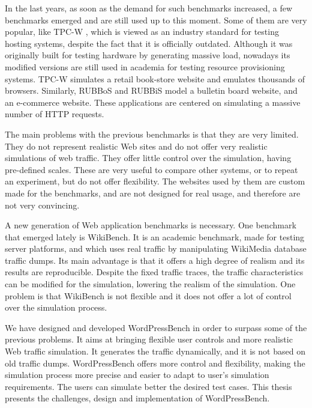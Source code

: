 In the last years, as soon as the demand for such benchmarks increased, a few benchmarks emerged and are still used up to this moment. Some of them are very popular, like TPC-W \cite{TPCW-website}, which is viewed as an industry standard for testing hosting systems, despite the fact that it is officially outdated. Although it was originally built for testing hardware by generating massive load, nowadays its modified versions are still used in academia for testing resource provisioning systems.  TPC-W simulates a retail book-store website and emulates thousands of browsers. Similarly, RUBBoS \cite{RUBBoS-website} and RUBBiS \cite{RUBiS-website} model a bulletin board website, and an e-commerce website. These applications are centered on simulating a massive number of HTTP requests.

The main problems with the previous benchmarks is that they are very limited. They do not represent realistic Web sites and do not offer very realistic simulations of web traffic. They offer little control over the simulation, having pre-defined scales. These are very useful to compare other systems, or to repeat an experiment, but do not offer flexibility. The websites used by them are custom made for the benchmarks, and are not designed for real usage, and therefore are not very convincing.

A new generation of Web application benchmarks is necessary. One benchmark that emerged lately is WikiBench. It is an academic  benchmark, made for testing server platforms, and which uses real traffic by manipulating WikiMedia database traffic dumps. Its main advantage is that it offers a high degree of realism and its results are reproducible. Despite the fixed traffic traces, the traffic characteristics can be modified for the simulation, lowering the realism of the simulation. One problem is that WikiBench is not flexible and it does not offer a lot of control over the simulation process.

We have designed and developed WordPressBench in order to surpass some of the previous problems. It aims at bringing flexible user controls and more realistic Web traffic simulation. It generates the traffic dynamically, and it is not based on old traffic dumps. WordPressBench offers more control and flexibility, making the simulation process more precise and easier to adapt to user's simulation requirements. The users can simulate better the desired test cases. This thesis presents the challenges, design and implementation of WordPressBench.

